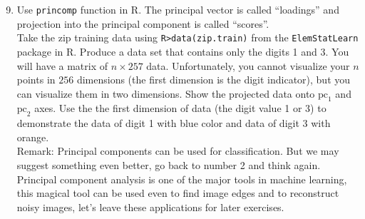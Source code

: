 \documentclass[
size=12pt,
paper=screen,
mode=handout,
style=simple,
nopagebreaks,
fleqn
]{powerdot}
\begin{document}
\begin{slide}{}
\begin{enumerate}
    \setcounter{enumi}{8}
\item Use \texttt{\color{blue}princomp} function in R. The principal vector is called ``loadings'' and projection into the principal component is called ``scores''. \\
Take the zip training data using \texttt{\color{blue}R>data(zip.train)}  from the \texttt{\color{blue}ElemStatLearn} package in R. Produce a data set that contains only the digits 1 and 3. You will have a matrix of $n\times 257$ data. Unfortunately, you cannot visualize your $n$ points in $256$ dimensions (the first dimension is the digit indicator), but you can visualize them in two dimensions. Show the projected data onto $\mathrm{pc}_1$ and $\mathrm{pc}_2$ axes. Use the the first dimension of data (the digit value 1 or 3) to demonstrate the data of digit 1 with blue color and data of digit 3 with orange.  \\
 \vspace{0.2in}
{\color{red}Remark:} Principal components can be used for classification. But we may suggest something even better, go back to number 2 and think again. Principal component analysis is one of the major tools in machine learning, this magical tool can be used even to find image edges and to reconstruct noisy images, let's leave these applications for later exercises.

 \end{enumerate}
\end{slide}
\end{document}

